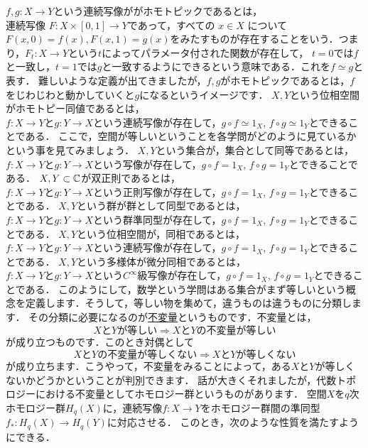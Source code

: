 $f,g:X\to Y$という連続写像ががホモトピックであるとは，\\
連続写像 $F : X \times [0, 1] \to Y$であって，すべての $x \in X$ について$ F(x, 0) = f(x), F(x, 1) = g(x) $をみたすものが存在することをいう．つまり，$F_t :X\to Y$という$t$によってパラメータ付された関数が存在して，
$t=0$では$f$と一致し，$t=1$では$g$と一致するようにできるという意味である．これを$f\simeq g$と表す．
難しいような定義が出てきましたが，$f,g$がホモトピックであるとは，$f$をじわじわと動かしていくと$g$になるというイメージです．
$X,Y$という位相空間がホモトピー同値であるとは，\\
$f:X\to Y$と$g:Y\to X$という連続写像が存在して，$g \circ f \simeq 1_X$, $f \circ g \simeq 1_Y$とできることである．
ここで，空間が等しいということを各学問がどのように見ているかという事を見てみましょう．
$X,Y$という集合が，集合として同等であるとは，\\
$f:X\to Y$と$g:Y\to X$という写像が存在して，$g \circ f = 1_X$, $f \circ g = 1_Y$とできることである．
{}
$X,Y \subset \mathbb C$が双正則であるとは，\\
$f:X\to Y$と$g:Y\to X$という正則写像が存在して，$g \circ f = 1_X$, $f \circ g = 1_Y$とできることである．
{}
$X,Y$という群が群として同型であるとは，\\
$f:X\to Y$と$g:Y\to X$という群準同型が存在して，$g \circ f = 1_X$, $f \circ g = 1_Y$とできることである．
{}
$X,Y$という位相空間が，同相であるとは，\\
$f:X\to Y$と$g:Y\to X$という連続写像が存在して，$g \circ f = 1_X$, $f \circ g = 1_Y$とできることである．
{}
$X,Y$という多様体が微分同相であるとは，\\
$f:X\to Y$と$g:Y\to X$という$C^\infty$級写像が存在して，$g \circ f = 1_X$, $f \circ g = 1_Y$とできることである．
このようにして，数学という学問はある集合がまず等しいという概念を定義します．そうして，等しい物を集めて，違うものは違うものに分類します． その分類に必要になるのが\underline{不変量}というものです．不変量とは，
\[
X と Y が等しい \Rightarrow XとYの不変量が等しい
\]
が成り立つものです．このとき対偶として
\[
 XとYの不変量が等しくない \Rightarrow X と Y が等しくない
\]
が成り立ちます．こうやって，不変量をみることによって，ある$X$と$Y$が等しくないかどうかということが判別できます．
話が大きくそれましたが，代数トポロジーにおける不変量としてホモロジー群というものがあります．
空間$X$を$q$次ホモロジー群$H_q(X)$に，連続写像$f:X\to Y$をホモロジー群間の準同型$f_* : H_q(X) \to H_q(Y)$に対応させる．
このとき，次のような性質を満たすようにできる．\\
